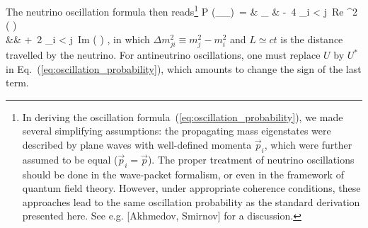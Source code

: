 The neutrino oscillation formula then reads\footnote{In deriving the oscillation
formula~(\ref{eq:oscillation_probability}), we made several simplifying assumptions:
the propagating mass eigenstates were described by plane waves with well-defined
momenta $\vec{p}_i$, which were further assumed to be equal ($\vec{p}_i = \vec{p}$).
The proper treatment of neutrino oscillations should be done in the wave-packet
formalism, or even in the framework of quantum field theory. However, under appropriate
coherence conditions, these approaches lead to the same oscillation probability
as the standard derivation presented here. See e.g. [Akhmedov, Smirnov] for a discussion.}
%
\bea
  P (\nu_\alpha \to \nu_\beta)\ = &\! \delta_{\alpha \beta}\!\! &
    -\ 4 \sum_{i < j}\, \mbox{Re} 
    \sin^2 \left(  \right)  \nn \\
    && +\ 2 \sum_{i < j}\, \mbox{Im} 
    \sin \left(  \right) ,
\label{eq:oscillation_probability}
\eea
%
in which $\Delta m^2_{ji} \equiv m^2_j - m^2_i$ and $L \simeq c t$ is the distance
travelled by the neutrino. For antineutrino oscillations, one must replace $U$ by
$U^*$ in Eq.~(\ref{eq:oscillation_probability}), which amounts to change the sign
of the last term.


